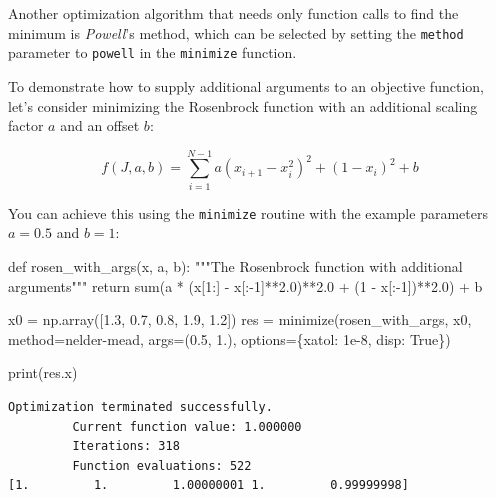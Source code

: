 \documentclass[
  letterpaper,
  DIV=11,
  numbers=noendperiod]{scrreprt}
\newenvironment{Shaded}{\begin{snugshade}}{\end{snugshade}}
\newcommand{\BuiltInTok}[1]{\textcolor[rgb]{0.00,0.23,0.31}{#1}}
\newcommand{\CommentTok}[1]{\textcolor[rgb]{0.37,0.37,0.37}{#1}}
\newcommand{\ControlFlowTok}[1]{\textcolor[rgb]{0.00,0.23,0.31}{#1}}
\newcommand{\DecValTok}[1]{\textcolor[rgb]{0.68,0.00,0.00}{#1}}
\newcommand{\FloatTok}[1]{\textcolor[rgb]{0.68,0.00,0.00}{#1}}
\newcommand{\KeywordTok}[1]{\textcolor[rgb]{0.00,0.23,0.31}{#1}}
\newcommand{\NormalTok}[1]{\textcolor[rgb]{0.00,0.23,0.31}{#1}}
\newcommand{\OperatorTok}[1]{\textcolor[rgb]{0.37,0.37,0.37}{#1}}
\newcommand{\StringTok}[1]{\textcolor[rgb]{0.13,0.47,0.30}{#1}}
\newcommand{\VariableTok}[1]{\textcolor[rgb]{0.07,0.07,0.07}{#1}}
\begin{document}
Another optimization algorithm that needs only function calls to find
the minimum is \emph{Powell}'s method, which can be selected by setting
the \texttt{method} parameter to
\texttt{\textquotesingle{}powell\textquotesingle{}} in the
\texttt{minimize} function.

To demonstrate how to supply additional arguments to an objective
function, let's consider minimizing the Rosenbrock function with an
additional scaling factor \(a\) and an offset \(b\):

\[
f(J, a, b) = \sum_{i=1}^{N-1} a (x_{i+1} - x_i^2)^2 + (1 - x_i)^2 + b
\]

You can achieve this using the \texttt{minimize} routine with the
example parameters \(a=0.5\) and \(b=1\):

\begin{Shaded}
\begin{Highlighting}[]
\KeywordTok{def}\NormalTok{ rosen\_with\_args(x, a, b):}
    \CommentTok{"""The Rosenbrock function with additional arguments"""}
    \ControlFlowTok{return} \BuiltInTok{sum}\NormalTok{(a }\OperatorTok{*}\NormalTok{ (x[}\DecValTok{1}\NormalTok{:] }\OperatorTok{{-}}\NormalTok{ x[:}\OperatorTok{{-}}\DecValTok{1}\NormalTok{]}\OperatorTok{**}\FloatTok{2.0}\NormalTok{)}\OperatorTok{**}\FloatTok{2.0} \OperatorTok{+}\NormalTok{ (}\DecValTok{1} \OperatorTok{{-}}\NormalTok{ x[:}\OperatorTok{{-}}\DecValTok{1}\NormalTok{])}\OperatorTok{**}\FloatTok{2.0}\NormalTok{) }\OperatorTok{+}\NormalTok{ b}

\NormalTok{x0 }\OperatorTok{=}\NormalTok{ np.array([}\FloatTok{1.3}\NormalTok{, }\FloatTok{0.7}\NormalTok{, }\FloatTok{0.8}\NormalTok{, }\FloatTok{1.9}\NormalTok{, }\FloatTok{1.2}\NormalTok{])}
\NormalTok{res }\OperatorTok{=}\NormalTok{ minimize(rosen\_with\_args, x0, method}\OperatorTok{=}\StringTok{\textquotesingle{}nelder{-}mead\textquotesingle{}}\NormalTok{,}
\NormalTok{               args}\OperatorTok{=}\NormalTok{(}\FloatTok{0.5}\NormalTok{, }\FloatTok{1.}\NormalTok{), options}\OperatorTok{=}\NormalTok{\{}\StringTok{\textquotesingle{}xatol\textquotesingle{}}\NormalTok{: }\FloatTok{1e{-}8}\NormalTok{, }\StringTok{\textquotesingle{}disp\textquotesingle{}}\NormalTok{: }\VariableTok{True}\NormalTok{\})}

\BuiltInTok{print}\NormalTok{(res.x)}
\end{Highlighting}
\end{Shaded}

\begin{verbatim}
Optimization terminated successfully.
         Current function value: 1.000000
         Iterations: 318
         Function evaluations: 522
[1.         1.         1.00000001 1.         0.99999998]
\end{verbatim}
\end{document}
